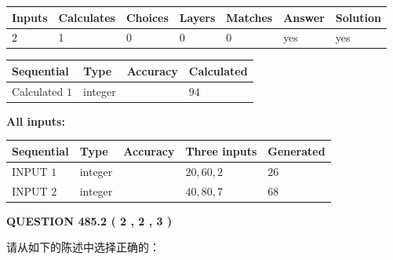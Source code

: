 \documentclass{ctexart}
\begin{document}
 
\noindent{}
 
 

 
   
   
   
   
\noindent\begin{tabular}{|l|l|l|l|l|l|l|}
 \hline
Inputs & Calculates & Choices & Layers & Matches & Answer & Solution \\ \hline
 2  & 
 1  & 
 0
  & 
 0  & 
 0  & 
  yes & 
  yes 
  \\ \hline
 \end{tabular}
   
   
   
   
\noindent{}
   
   
  
  
\noindent\begin{tabular}{|l|l|l|l|}
\hline
 Sequential & Type & Accuracy & Calculated \\ 
\hline
 
 
  Calculated $  1 $ & integer &  & 
  $ 94 $ 
 \\  \hline  
 \end{tabular}
   
   
   
   
\noindent\vspace{0.1in}\hspace{-0.08in} {\textbf{\Large{All inputs: }}}
   
   
  
  
\noindent\begin{tabular}{|l|l|l|l|l|}
\hline
 Sequential & Type & Accuracy & Three inputs & Generated \\ 
\hline
 
 
  INPUT $  1 $ & integer &  & $
 20
 , 
 60
 , 
 2
 $ & $ 26 $ 
 \\  \hline  
 
 
  INPUT $  2 $ & integer &  & $
 40
 , 
 80
 , 
 7
 $ & $ 68 $ 
 \\  \hline  
 \end{tabular}
   
   
  
\vspace{0.2in}
  
{\textbf{\Large{QUESTION
485.2 
 ( 2 , 2 , 3 )
}}}
  
  
请从如下的陈述中选择正确的：
 
\end{document}
